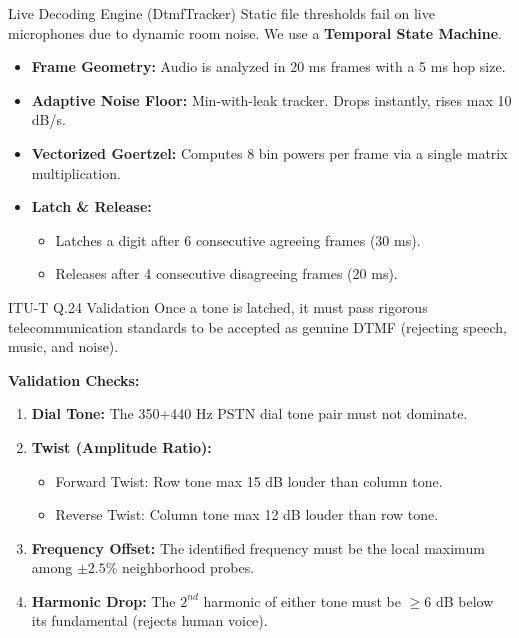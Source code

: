 \documentclass[aspectratio=169]{beamer}
\begin{document}
\begin{frame}{Live Decoding Engine (DtmfTracker)}
    Static file thresholds fail on live microphones due to dynamic room noise. We use a \textbf{Temporal State Machine}.
    
    \vspace{0.3cm}
    \begin{itemize}
        \item \textbf{Frame Geometry:} Audio is analyzed in 20 ms frames with a 5 ms hop size.
        \item \textbf{Adaptive Noise Floor:} Min-with-leak tracker. Drops instantly, rises max 10 dB/s.
        \item \textbf{Vectorized Goertzel:} Computes 8 bin powers per frame via a single matrix multiplication.
        \item \textbf{Latch \& Release:} 
        \begin{itemize}
            \item Latches a digit after 6 consecutive agreeing frames (30 ms).
            \item Releases after 4 consecutive disagreeing frames (20 ms).
        \end{itemize}
    \end{itemize}
\end{frame}

\begin{frame}{ITU-T Q.24 Validation}
    Once a tone is latched, it must pass rigorous telecommunication standards to be accepted as genuine DTMF (rejecting speech, music, and noise).
    
    \vspace{0.5cm}
    \textbf{Validation Checks:}
    \begin{enumerate}
        \item \textbf{Dial Tone:} The 350+440 Hz PSTN dial tone pair must not dominate.
        \item \textbf{Twist (Amplitude Ratio):} 
        \begin{itemize}
            \item Forward Twist: Row tone max 15 dB louder than column tone.
            \item Reverse Twist: Column tone max 12 dB louder than row tone.
        \end{itemize}
        \item \textbf{Frequency Offset:} The identified frequency must be the local maximum among $\pm 2.5\%$ neighborhood probes.
        \item \textbf{Harmonic Drop:} The $2^{nd}$ harmonic of either tone must be $\ge 6$ dB below its fundamental (rejects human voice).
    \end{enumerate}
\end{frame}
\end{document}
